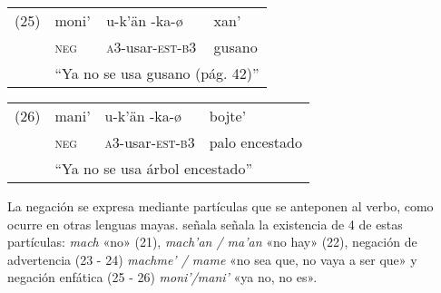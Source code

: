 {%
\begin{tabular}{llll}
(25) & moni' & u-k'än -ka-ø & xan' \\
& \textsc{neg} & \textsc{a3}-usar-\textsc{est-b3} & gusano \\
& \multicolumn{3}{l}{``Ya no se usa gusano (pág. 42)''}\\
\end{tabular} \vspace{0.3cm}

\begin{tabular}{llll}
(26) & mani' & u-k'än -ka-ø & bojte' \\
& \textsc{neg} & \textsc{a3}-usar-\textsc{est-b3} & palo encestado \\
 & \multicolumn{3}{l}{``Ya no se usa árbol encestado''} \\
\end{tabular} \vspace{0.5cm}
}

La negación se expresa mediante partículas que se anteponen al verbo, como ocurre en otras lenguas mayas. \textcolor{MidnightBlue}{\citet{ChontalTabasco}} señala señala la existencia de 4 de estas partículas: \textit{mach} «no» (21), \textit{mach'an / ma'an} «no hay» (22), negación de advertencia (23 - 24) \textit{machme' / mame} «no sea que, no vaya a ser que» y negación enfática (25 - 26) \textit{moni'/mani'} «ya no, no es».
